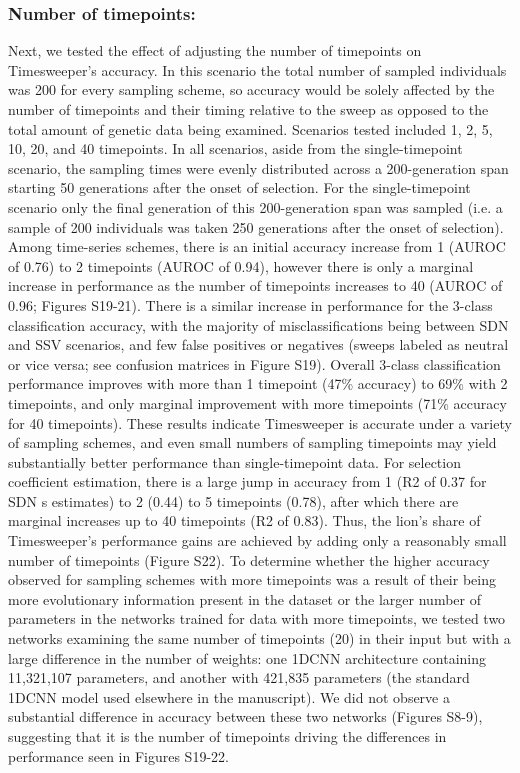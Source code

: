 \subsubsection{Number of timepoints:} Next, we tested the effect of adjusting the number of timepoints on Timesweeper’s accuracy. In this scenario the total number of sampled individuals was 200 for every sampling scheme, so accuracy would be solely affected by the number of timepoints and their timing relative to the sweep as opposed to the total amount of genetic data being examined. Scenarios tested included 1, 2, 5, 10, 20, and 40 timepoints. In all scenarios, aside from the single-timepoint scenario, the sampling times were evenly distributed across a 200-generation span starting 50 generations after the onset of selection. For the single-timepoint scenario only the final generation of this 200-generation span was sampled (i.e. a sample of 200 individuals was taken 250 generations after the onset of selection). Among time-series schemes, there is an initial accuracy increase from 1 (AUROC of 0.76) to 2 timepoints (AUROC of 0.94), however there is only a marginal increase in performance as the number of timepoints increases to 40 (AUROC of 0.96; Figures S19-21). There is a similar increase in performance for the 3-class classification accuracy, with the majority of misclassifications being between SDN and SSV scenarios, and few false positives or negatives (sweeps labeled as neutral or vice versa; see confusion matrices in Figure S19). Overall 3-class classification performance improves with more than 1 timepoint (47\% accuracy) to 69\% with 2 timepoints, and only marginal improvement with more timepoints (71\% accuracy for 40 timepoints). These results indicate Timesweeper is accurate under a variety of sampling schemes, and even small numbers of sampling timepoints may yield substantially better performance than single-timepoint data. For selection coefficient estimation, there is a large jump in accuracy from 1 (R2 of 0.37 for SDN s estimates) to 2 (0.44) to 5 timepoints (0.78), after which there are marginal increases up to 40 timepoints (R2 of 0.83). Thus, the lion’s share of Timesweeper’s performance gains are achieved by adding only a reasonably small number of timepoints (Figure S22).
To determine whether the higher accuracy observed for sampling schemes with more timepoints was a result of their being more evolutionary information present in the dataset or the larger number of parameters in the networks trained for data with more timepoints, we tested two networks examining the same number of timepoints (20) in their input but with a large difference in the number of weights: one 1DCNN architecture containing 11,321,107 parameters, and another with 421,835 parameters (the standard 1DCNN model used elsewhere in the manuscript). We did not observe a substantial difference in accuracy between these two networks (Figures S8-9), suggesting that it is the number of timepoints driving the differences in performance seen in Figures S19-22. \\

